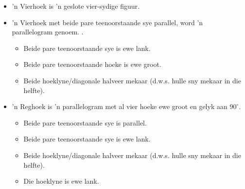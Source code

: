 \Opsomming
\begin{itemize}[noitemsep]
\item ’n Vierhoek is ’n geslote vier-sydige figuur.
\item ’n Vierhoek met beide pare teenoorstaande sye parallel, word ’n parallelogram genoem. .
\begin{itemize}
\item Beide pare teenoorstaande sye is ewe lank.
\item Beide pare teenoorstaande hoeke is ewe groot.
\item Beide hoeklyne/diagonale halveer mekaar (d.w.s. hulle sny mekaar in die helfte).
\end{itemize}
\item ’n Reghoek is ’n parallelogram met al vier hoeke ewe groot en gelyk aan $90^\circ$.
\begin{itemize}
\item Beide pare teenoorstaande sye is parallel.
\item Beide pare teenoorstaande sye is ewe lank.
\item Beide hoeklyne/diagonale halveer mekaar (d.w.s. hulle sny mekaar in die helfte).
\item Die hoeklyne is ewe lank.


\end{itemize}
\end{itemize}
